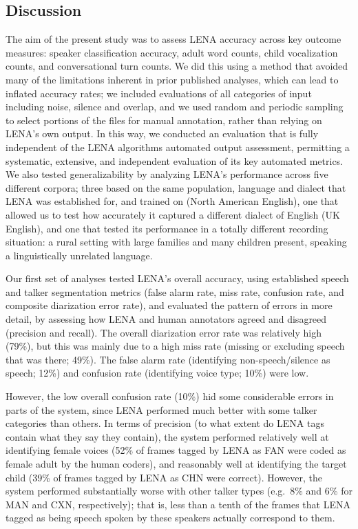\documentclass[english,floatsintext,man]{apa6}
\begin{document}
\subsection{Discussion}\label{discussion}

The aim of the present study was to assess LENA accuracy across key
outcome measures: speaker classification accuracy, adult word counts,
child vocalization counts, and conversational turn counts. We did this
using a method that avoided many of the limitations inherent in prior
published analyses, which can lead to inflated accuracy rates; we
included evaluations of all categories of input including noise, silence
and overlap, and we used random and periodic sampling to select portions
of the files for manual annotation, rather than relying on LENA's own
output. In this way, we conducted an evaluation that is fully
independent of the LENA algorithms automated output assessment,
permitting a systematic, extensive, and independent evaluation of its
key automated metrics. We also tested generalizability by analyzing
LENA's performance across five different corpora; three based on the
same population, language and dialect that LENA was established for, and
trained on (North American English), one that allowed us to test how
accurately it captured a different dialect of English (UK English), and
one that tested its performance in a totally different recording
situation: a rural setting with large families and many children
present, speaking a linguistically unrelated language.

Our first set of analyses tested LENA's overall accuracy, using
established speech and talker segmentation metrics (false alarm rate,
miss rate, confusion rate, and composite diarization error rate), and
evaluated the pattern of errors in more detail, by assessing how LENA
and human annotators agreed and disagreed (precision and recall). The
overall diarization error rate was relatively high (79\%), but this was
mainly due to a high miss rate (missing or excluding speech that was
there; 49\%). The false alarm rate (identifying non-speech/silence as
speech; 12\%) and confusion rate (identifying voice type; 10\%) were
low.

However, the low overall confusion rate (10\%) hid some considerable
errors in parts of the system, since LENA performed much better with
some talker categories than others. In terms of precision (to what
extent do LENA tags contain what they say they contain), the system
performed relatively well at identifying female voices (52\% of frames
tagged by LENA as FAN were coded as female adult by the human coders),
and reasonably well at identifying the target child (39\% of frames
tagged by LENA as CHN were correct). However, the system performed
substantially worse with other talker types (e.g.~8\% and 6\% for MAN
and CXN, respectively); that is, less than a tenth of the frames that
LENA tagged as being speech spoken by these speakers actually correspond
to them.
\end{document}
